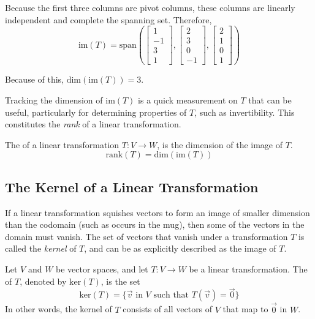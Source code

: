 \documentclass{ximera}
\begin{document}
\begin{example}
\begin{explanation}
Because the first three columns are pivot columns, these columns are linearly independent and complete the spanning set.  Therefore,
$$\mbox{im}(T)=\mbox{span}\left(\begin{bmatrix}1\\-1\\3\\1\end{bmatrix}, \begin{bmatrix}2\\3\\0\\-1\end{bmatrix}, \begin{bmatrix}2\\1\\0\\1\end{bmatrix}\right)$$

Because of this, $\mbox{dim}(\mbox{im}(T))=3$.
\end{explanation}
\end{example}
 
Tracking the dimension of $\mbox{im}(T)$ is a quick measurement on $T$ that can be useful, particularly for determining properties of $T$, such as invertibility. This constitutes the \emph{rank} of a linear transformation.
 
\begin{definition}\label{def:rankofT}
The  of a linear transformation $T:V\rightarrow W$, is the dimension of the image of $T$.
$$\mbox{rank}(T)=\mbox{dim}(\mbox{im}(T))$$
\end{definition}

 
\subsection*{The Kernel of a Linear Transformation}

If a linear transformation squishes vectors to form an image of smaller dimension than the codomain (such as occurs in the mug), then some of the vectors in the domain must vanish. The set of vectors that vanish under a transformation $T$ is called the \emph{kernel} of $T$, and can be as explicitly described as the image of $T$.
 
\begin{definition}\label{def:kernel}
Let $V$ and $W$ be vector spaces, and let $T:V\rightarrow W$ be a linear transformation.  The  of $T$, denoted by $\mbox{ker}(T)$, is the set
$$\mbox{ker}(T)=\{\vec{v}\text{ in }V\text{ such that }T(\vec{v})=\vec{0}\}$$
In other words, the kernel of $T$ consists of all vectors of $V$ that map to $\vec{0}$ in $W$.
\end{definition}
\end{document}
